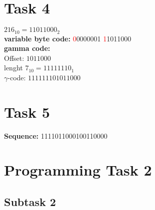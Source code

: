 \documentclass[a4paper]{scrartcl}
\begin{document}
\section*{Task 4}
$216_{10} = 11011000_{2}$ \\ 
\textbf{variable byte code: } \textcolor{red}{0}0000001 \textcolor{red}{1}1011000 \\
\textbf{gamma code: }\\
Offset: $1011000$ \\ lenght $7_{10} = 11111110_{1}$ \\ $\gamma$-code: $111111101011000$

\section*{Task 5}
\textbf{Sequence: }1111011000100110000


\pagebreak
\section*{Programming Task 2}
\subsection*{Subtask 2}

\end{document}
